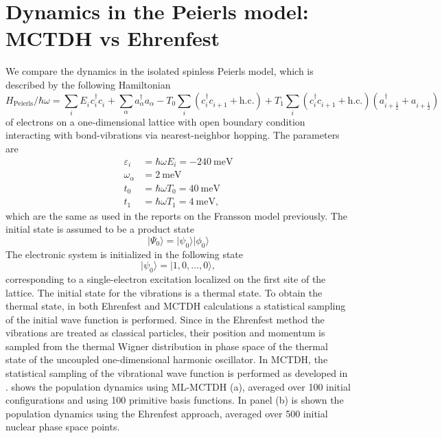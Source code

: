 \documentclass{article}
\newcommand{\pdagger}{{\phantom{\dagger}}}
\begin{document}
\section{Dynamics in the Peierls model: MCTDH vs Ehrenfest}
We compare the dynamics in the isolated spinless Peierls model, which is described by the following Hamiltonian
\begin{equation*}
	H_\mathrm{Peierls}/\hbar\omega = \sum_i E_i^\pdagger c_i^\dagger c_i^\pdagger + \sum_\alpha a_\alpha^\dagger a_\alpha^\pdagger -T_0\sum_i (c_i^\dagger c_{i+1}^\pdagger + \mathrm{h.c.}) + T_1\sum_{i}(c_i^\dagger c_{i+1}^\pdagger + \mathrm{h.c.})(a_{i+\frac{1}{2}}^\dagger + a_{i+\frac{1}{2}}^\pdagger)
\end{equation*}
of electrons on a one-dimensional lattice with open boundary condition interacting with bond-vibrations via nearest-neighbor hopping. The parameters are 
\begin{align*}
	\varepsilon_i &= \hbar\omega E_i= -\SI{240}{\milli\electronvolt}\\
	\omega_\alpha &= \SI{2}{\milli\electronvolt}\\
	t_0 &= \hbar\omega T_0= \SI{40}{\milli\electronvolt}\\
	t_1 &= \hbar\omega T_1 = \SI{4}{\milli\electronvolt},
\end{align*}
which are the same as used in the reports on the Fransson model previously. 
The initial state is assumed to be a product state
\begin{equation*}
	\vert \Psi_0\rangle = \vert \psi_0\rangle \vert \phi_0\rangle
\end{equation*}
The electronic system is initialized in the following state
\begin{equation*}
	\vert \psi_0\rangle = \vert 1,0,\dots,0\rangle,
\end{equation*}
corresponding to a single-electron excitation localized on the first site of the lattice. The initial state for the vibrations is a thermal state. To obtain the thermal state, in both Ehrenfest and MCTDH calculations a statistical sampling of the initial wave function is performed. Since in the Ehrenfest method the vibrations are treated as classical particles, their position and momentum is sampled from the thermal Wigner distribution in phase space of the thermal state of the uncoupled one-dimensional harmonic oscillator. In MCTDH, the statistical sampling of the vibrational wave function is performed as developed in \cite{manthe2001partition}.  shows the population dynamics using ML-MCTDH (a), averaged over 100 initial configurations and using 100 primitive basis functions. In panel (b) is shown the population dynamics using the Ehrenfest approach, averaged over 500 initial nuclear phase space points. 
\end{document}
